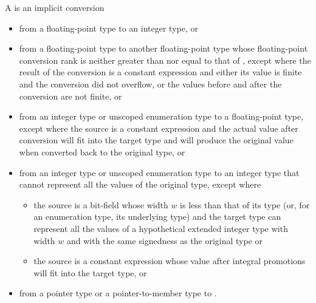 \pnum
A  is an implicit conversion
\begin{itemize}
\item from a floating-point type to an integer type, or

\item from a floating-point type  to another floating-point type
whose floating-point conversion rank is neither greater than nor equal to
that of ,
except where the result of the conversion is a constant expression and
either its value is finite and the conversion did not overflow, or
the values before and after the conversion are not finite, or

\item from an integer type or unscoped enumeration type to a floating-point type, except
where the source is a constant expression and the actual value after conversion will fit
into the target type and will produce the original value when converted back to the
original type, or

\item from an integer type or unscoped enumeration type to an integer type that cannot
represent all the values of the original type, except where
\begin{itemize}
\item
the source is a bit-field whose width $w$ is less than that of its type
(or, for an enumeration type, its underlying type) and
the target type can represent all the values
of a hypothetical extended integer type
with width $w$ and with the same signedness as the original type or
\item
the source is a constant
expression whose value after integral promotions will fit into the target type, or
\end{itemize}

\item from a pointer type or a pointer-to-member type to .
\end{itemize}

